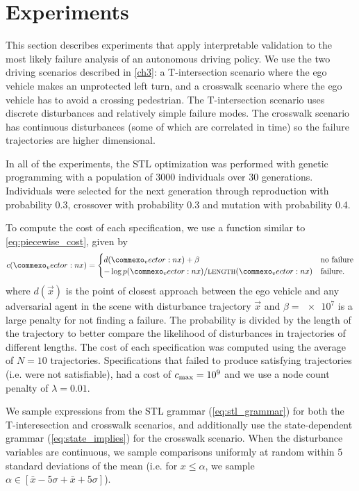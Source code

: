 \section{Experiments}
This section describes experiments that apply interpretable validation to the most likely failure analysis of an autonomous driving policy. We use the two driving scenarios described in \cref{ch3}: a T-intersection scenario where the ego vehicle makes an unprotected left turn, and a crosswalk scenario where the ego vehicle has to avoid a crossing pedestrian. The T-intersection scenario uses discrete disturbances and relatively simple failure modes. The crosswalk scenario has continuous disturbances (some of which are correlated in time) so the failure trajectories are higher dimensional. 

In all of the experiments, the STL optimization was performed with genetic programming with a population of \num{3000} individuals over \num{30} generations. Individuals were selected for the next generation through reproduction with probability \num{0.3}, crossover with probability \num{0.3} and mutation with probability \num{0.4}.

To compute the cost of each specification, we use a function similar to \cref{eq:piecewise_cost}, given by
\begin{equation}
    c(\vec{x}) = \begin{cases}
        d(\vec{x}) + \beta  & \text{no failure} \\
        -\log p(\vec{x}) / \textproc{length}(\vec{x}) & \text{failure} \text{.} \label{eq:piecewise_cost}
    \end{cases}
\end{equation}
where $d(\vec{x})$ is the point of closest approach between the ego vehicle and any adversarial agent in the scene with disturbance trajectory $\vec{x}$ and $\beta = \num{e7}$ is a large penalty for not finding a failure. The probability is divided by the length of the trajectory to better compare the likelihood of disturbances in trajectories of different lengths. The cost of each specification was computed using the average of $N=10$ trajectories. Specifications that failed to produce satisfying trajectories (i.e. were not satisfiable), had a cost of $c_{\rm max} = \num{e9}$ and we use a node count penalty of $\lambda = 0.01$. 

We sample expressions from the STL grammar (\cref{eq:stl_grammar}) for both the T-interesection and crosswalk scenarios, and additionally use the state-dependent grammar (\cref{eq:state_implies}) for the crosswalk scenario. When the disturbance variables are continuous, we sample comparisons uniformly at random within \num{5} standard deviations of the mean (i.e. for $x \leq \alpha$, we sample $\alpha \in [\bar{x}-5\sigma + \bar{x} + 5 \sigma]$). 

